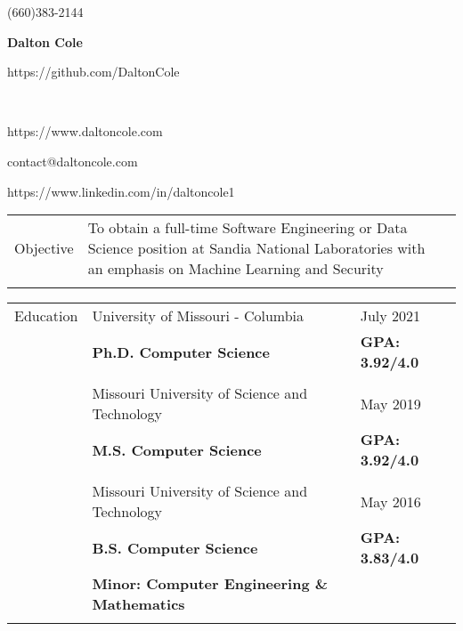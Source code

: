 \documentclass[10.5pt, arial]{article}
\newcommand\textbox[1]{%
  \parbox{.333\textwidth}{#1}%
}
\begin{document}
\noindent   \textbox{(660)383-2144 \hfill}                                \textbox{\hfil \textbf{Dalton Cole}    \hfil} \textbox{\hfill https://github.com/DaltonCole} \\
\noindent   \textbox{https://www.daltoncole.com \hfill}     \textbox{\hfil contact@daltoncole.com  \hfil}               \textbox{\hfill https://www.linkedin.com/in/daltoncole1}
\noindent\makebox[\linewidth]{\rule{\textwidth}{.4pt}} 

\begin{tabular}{p{1.5cm} p{13.2cm} l}
        Objective  	& To obtain a full-time Software Engineering or Data Science position at Sandia National Laboratories with an emphasis on Machine Learning and Security   & \\ \\
\end{tabular}

\begin{tabular}{p{1.5cm} p{13.2cm} l}
Education  	& University of Missouri - Columbia				 					& July 2021 				\\
			& \textbf{Ph.D. Computer Science} 									& \textbf{GPA: 3.92/4.0}	\\
            \\
			& Missouri University of Science and Technology 					& May 2019 				    \\
			& \textbf{M.S. Computer Science}									& \textbf{GPA: 3.92/4.0}	\\
            \\
		  	& Missouri University of Science and Technology 					& May 2016 				    \\
			& \textbf{B.S. Computer Science} 									& \textbf{GPA: 3.83/4.0}    \\
			& \textbf{Minor: Computer Engineering \& Mathematics} 										    \\ \\
\end{tabular}
\end{document}
